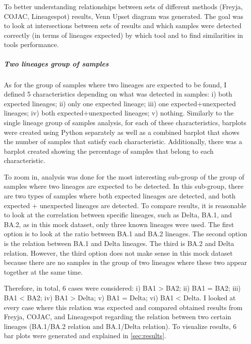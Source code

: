                 To better understanding relationships between sets of different methods (Freyja, COJAC, Lineagespot) results, Venn Upset diagram was generated. The goal was to look at intersections between sets of results and which samples were detected correctly (in terms of lineages expected) by which tool and to find similarities in tools performance.

            
                \subparagraph{Two lineages group of samples}
                As for the group of samples where two lineages are expected to be found, I defined 5 characteristics depending on what was detected in samples: i) both expected lineages; ii) only one expected lineage; iii) one expected+unexpected lineages; iv) both expected+unexpected lineages; v) nothing. Similarly to the single lineage group of samples analysis, for each of these characteristics, barplots were created using Python separately as well as a combined barplot that shows the number of samples that satisfy each characteristic. Additionally, there was a barplot created showing the percentage of samples that belong to each characteristic.

                To zoom in, analysis was done for the most interesting sub-group of the group of samples where two lineages are expected to be detected. In this sub-group, there are two types of samples where both expected lineages are detected, and both expected + unexpected lineages are detected. To compare results, it is reasonable to look at the correlation between specific lineages, such as Delta, BA.1, and BA.2, as in this mock dataset, only three known lineages were used. The first option is to look at the ratio between BA.1 and BA.2 lineages. The second option is the relation between BA.1 and Delta lineages. The third is BA.2 and Delta relation. However, the third option does not make sense in this mock dataset because there are no samples in the group of two lineages where these two appear together at the same time.
                
                Therefore, in total, 6 cases were considered: i) BA1 > BA2; ii) BA1 = BA2; iii) BA1 < BA2; iv) BA1 > Delta;  v) BA1 = Delta;  vi) BA1 < Delta. 
                I looked at every case where this relation was expected and compared obtained results from Freyja, COJAC, and Lineagespot regarding the relation between two certain lineages (BA.1/BA.2 relation and BA.1/Delta relation). To visualize results, 6 bar plots were generated and explained in \cref{sec:results}.
                
